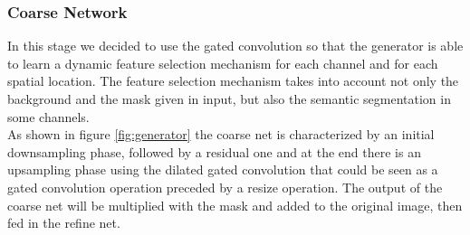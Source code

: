 \documentclass[10pt,twocolumn,letterpaper]{article}
\begin{document}
\subsubsection{Coarse Network}
In this stage we decided to use the gated convolution \cite{yu2019free} so that the generator is
able to learn a dynamic feature selection mechanism for each channel and for
each spatial location. The feature selection mechanism takes into account not
only the background and the mask given in input, but also the semantic
segmentation in some channels.
\\
As shown in figure \ref{fig:generator} the coarse net is
characterized by an initial downsampling phase, followed by a residual one
and at the end there is an upsampling phase using the dilated gated convolution
that could be seen as a gated convolution operation preceded by a resize
operation. The output of the coarse net will be multiplied with the mask and
added to the original image, then fed in the refine net.
\end{document}
